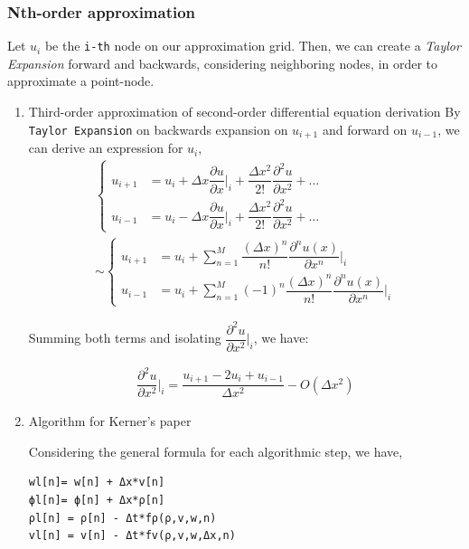 \documentclass[11pt]{article}
\begin{document}
\subsubsection{Nth-order approximation}
\label{sec:org8d5d0ee}
Let \(u_i\) be the \texttt{i-th} node on our approximation grid. Then, we can create a
\emph{Taylor Expansion} forward and backwards, considering neighboring nodes, in order
to approximate a point-node.

\begin{enumerate}
\item Third-order approximation of second-order differential equation derivation
\label{sec:orgda61e51}
By \texttt{Taylor Expansion} on backwards expansion on \(u_{i+1}\) and forward on
\(u_{i-1}\), we can derive an expression for \(u_i\),
\begin{equation}
\begin{aligned}
\begin{cases}
u_{i+1} &= u_{i} + \Delta{x}\dfrac{\partial{u}}{\partial{x}}\biggr\rvert_i + \dfrac{\Delta{x^2}}{2!}\dfrac{\partial^2{u}}{\partial{x^2}} + \ldots \\
u_{i-1} &= u_{i} - \Delta{x}\dfrac{\partial{u}}{\partial{x}}\biggr\rvert_i + \dfrac{\Delta{x^2}}{2!}\dfrac{\partial^2{u}}{\partial{x^2}} + \ldots
\end{cases}\\
\sim
\begin{cases}
u_{i+1} &= u_{i} + \sum_{n=1}^{M}{\dfrac{(\Delta{x})^n}{n!}\dfrac{\partial^n{u(x)}}{\partial{x^n}}\biggr\rvert_i}\\
u_{i-1} &= u_{i} + \sum_{n=1}^{M}{(-1)^n\dfrac{(\Delta{x})^n}{n!}\dfrac{\partial^n{u(x)}}{\partial{x^n}}\biggr\rvert_i}
\end{cases}
\end{aligned}
\end{equation}

Summing both terms and isolating
\(\dfrac{\partial^2{u}}{\partial{x^2}}\biggr\rvert_i\), we have:

\begin{equation}
\begin{aligned}
\dfrac{\partial^2{u}}{\partial{x^2}}\biggr\rvert_i = \dfrac{u_{i+1}-2u_i+u_{i-1}}{\Delta{x^2}} - O(\Delta{x^2})
\end{aligned}
\end{equation}
\item Algorithm for Kerner's paper
\label{sec:org11ae2af}

Considering the general formula for each algorithmic step, we have,
\begin{verbatim}
wl[n]= w[n] + Δx*v[n]
ϕl[n]= ϕ[n] + Δx*ρ[n]
ρl[n] = ρ[n] - Δt*fρ(ρ,v,w,n)
vl[n] = v[n] - Δt*fv(ρ,v,w,Δx,n)
\end{verbatim}


\end{enumerate}
\end{document}
